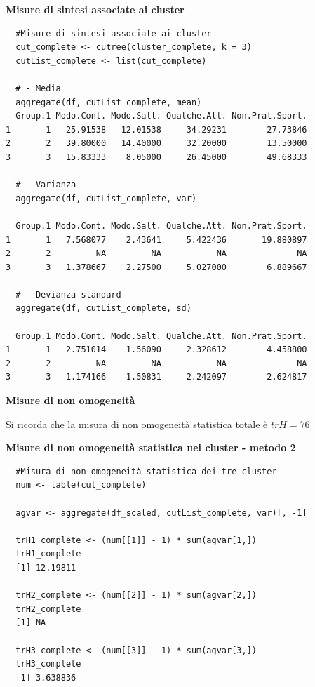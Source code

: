 \noindent \textbf{Misure di sintesi associate ai cluster}

\vspace{5mm}
\begin{lstlisting}
  #Misure di sintesi associate ai cluster
  cut_complete <- cutree(cluster_complete, k = 3)
  cutList_complete <- list(cut_complete)

  # - Media
  aggregate(df, cutList_complete, mean)
  Group.1 Modo.Cont. Modo.Salt. Qualche.Att. Non.Prat.Sport.
1       1   25.91538   12.01538     34.29231        27.73846
2       2   39.80000   14.40000     32.20000        13.50000
3       3   15.83333    8.05000     26.45000        49.68333

  # - Varianza
  aggregate(df, cutList_complete, var)
  
  Group.1 Modo.Cont. Modo.Salt. Qualche.Att. Non.Prat.Sport.
1       1   7.568077    2.43641     5.422436       19.880897
2       2         NA         NA           NA              NA
3       3   1.378667    2.27500     5.027000        6.889667

  # - Devianza standard
  aggregate(df, cutList_complete, sd)

  Group.1 Modo.Cont. Modo.Salt. Qualche.Att. Non.Prat.Sport.
1       1   2.751014    1.56090     2.328612        4.458800
2       2         NA         NA           NA              NA
3       3   1.174166    1.50831     2.242097        2.624817
\end{lstlisting}
\vspace{5mm}

\noindent \textbf{Misure di non omogeneità}

Si ricorda che la misura di non omogeneità statistica totale è $trH = 76$

\noindent \textbf{Misure di non omogeneità statistica nei cluster - metodo 2}

\vspace{5mm}
\begin{lstlisting}
  #Misura di non omogeneità statistica dei tre cluster
  num <- table(cut_complete)

  agvar <- aggregate(df_scaled, cutList_complete, var)[, -1]

  trH1_complete <- (num[[1]] - 1) * sum(agvar[1,])
  trH1_complete
  [1] 12.19811

  trH2_complete <- (num[[2]] - 1) * sum(agvar[2,])
  trH2_complete
  [1] NA

  trH3_complete <- (num[[3]] - 1) * sum(agvar[3,])
  trH3_complete
  [1] 3.638836
\end{lstlisting}
\vspace{5mm}

